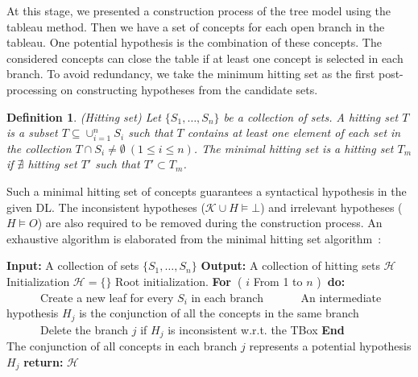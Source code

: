 \documentclass{article}
\newtheorem{mydef}{Definition}
\begin{document}
At this stage, we presented a construction process of the tree model using  the tableau method. Then we have a set of concepts for each open branch in the tableau.
One potential hypothesis is the combination of these concepts. The considered concepts can close the table if at least one concept is selected in each branch.
To avoid redundancy, we take the minimum hitting set as the first post-processing on constructing hypotheses from the candidate sets. 
\begin{mydef}{(Hitting set)}
 Let $\{ S_1,\dots,S_n\}$ be a collection of sets. A hitting set  $T$ is a subset $T\subseteq \cup_{i=1}^{n} S_i$ such that $T$ contains at least one element
 of each set in the collection $T \cap S_i \neq \emptyset~(1\leq i\leq n)$.
 The minimal hitting set is a hitting set $T_m$ if  $\nexists$ hitting set $T'$ such that $T'\subset T_m$.
\end{mydef}

Such a minimal hitting set of concepts guarantees a syntactical hypothesis in the given DL. 
The inconsistent hypotheses ($\mathcal{K} \cup H \vDash \bot$) and irrelevant hypotheses ($H \vDash O$) are also required to be removed during the construction process.
An exhaustive algorithm is elaborated from the minimal hitting set algorithm~\cite{reiter1987theory}:
\begin{algorithm}[H]
\textbf{Input:} A collection of sets $\{S_1,\dots,S_n\}$\;
\textbf{Output:} A collection of hitting sets $\mathcal{H}$\;
Initialization\:
$\mathcal{H}=\{\}$\;
Root initialization.\;
\textbf{For~}( $i$ From 1 to $n$ )\textbf{~do:}\\
~~~~~~Create a new leaf for every  $S_i$  in each branch\;
~~~~~~An intermediate hypothesis $H_{j}$ is the conjunction of all the concepts in the same branch\;
~~~~~~Delete the branch $j$ if $H_{j}$ is inconsistent w.r.t. the TBox\;
\textbf{End}\\
The conjunction of all concepts in each branch $j$ represents a potential hypothesis $H_j$\;
\textbf{return:} $\mathcal{H}$\;
\caption{Exhaustive search algorithm of selecting hitting sets.}\label{algo:exhaustive}
\end{algorithm}
\end{document}
